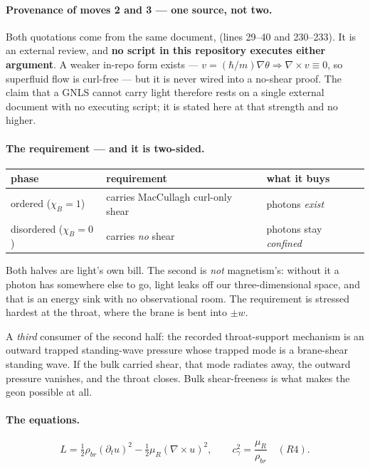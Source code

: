 \paragraph{Provenance of moves 2 and 3 --- one source, not two.}
Both quotations come from the same document,
(lines 29--40 and 230--233). It is an external review, and \textbf{no script in
this repository executes either argument}. A weaker in-repo form exists ---
\(v=(\hbar/m)\nabla\theta \Rightarrow \nabla\times v\equiv 0\), so superfluid
flow is curl-free --- but it is never wired into a no-shear proof. The claim
that a GNLS cannot carry light therefore rests on a single external document
with no executing script; it is stated here at that strength and no higher.

\paragraph{The requirement --- and it is two-sided.}
\begin{center}
\begin{tabular}{@{}lll@{}}
\toprule
phase & requirement & what it buys \\
\midrule
ordered (\(\chi_B=1\))    & carries MacCullagh curl-only shear & photons \emph{exist} \\
disordered (\(\chi_B=0\)) & carries \emph{no} shear            & photons stay \emph{confined} \\
\bottomrule
\end{tabular}
\end{center}

\noindent
Both halves are light's own bill. The second is \emph{not} magnetism's: without
it a photon has somewhere else to go, light leaks off our three-dimensional
space, and that is an energy sink with no observational room. The requirement is
stressed hardest at the throat, where the brane is bent into \(\pm w\).

A \emph{third} consumer of the second half: the recorded throat-support
mechanism is an outward trapped standing-wave pressure whose trapped mode is a
brane-shear standing wave. If the bulk carried shear, that mode radiates away,
the outward pressure vanishes, and the throat closes. Bulk shear-freeness is
what makes the geon possible at all.

\paragraph{The equations.}
\[
  L=\tfrac12\rho_{br}(\partial_t u)^2-\tfrac12\mu_R(\nabla\times u)^2,
  \qquad
  c_\gamma^2=\frac{\mu_R}{\rho_{br}} \quad (R4).
\]

